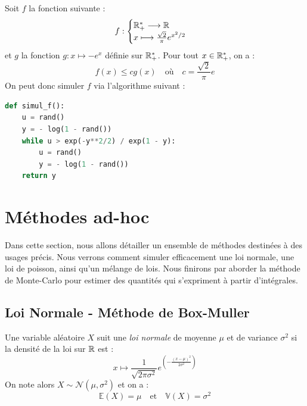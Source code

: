\begin{example}
    Soit $f$ la fonction suivante : 
        $$ 
            f : 
                \begin{cases}
                    \mathbb{R}_+^* \longrightarrow \mathbb{R} \\ 
                    x \longmapsto \frac{\sqrt{2}}{\pi} e^{x^2/2}
                \end{cases}
        $$ 
    et $g$ la fonction $ g : x \longmapsto -e^x$ définie sur $ \mathbb{R}_+^*$. Pour tout $x \in \mathbb{R}_+^*$, on a : 
            $$ f(x) \leqslant cg(x) \quad \text{où} \quad c = \frac{\sqrt{2}}{\pi} e$$
    On peut donc simuler $f$ via l'algorithme suivant : 
    \begin{lstlisting}[language=Python]
def simul_f(): 
    u = rand() 
    y = - log(1 - rand())
    while u > exp(-y**2/2) / exp(1 - y): 
        u = rand() 
        y = - log(1 - rand())
    return y
    \end{lstlisting}
\end{example}



\section{Méthodes ad-hoc}

Dans cette section, nous allons détailler un ensemble de méthodes destinées à des usages précis. 
Nous verrons comment simuler efficacement une loi normale, une loi de poisson, ainsi qu'un mélange de lois. 
Nous finirons par aborder la méthode de Monte-Carlo pour estimer des quantités qui s'expriment à partir d'intégrales. 

\subsection{Loi Normale - Méthode de Box-Muller}

\begin{rappel}
    Une variable aléatoire $X$ suit une \emph{loi normale} de moyenne $ \mu$ et de variance $ \sigma^2$ si 
    la densité de la loi sur $\mathbb{R}$ est : 
        $$ x \longmapsto \frac{1}{\sqrt{2 \pi \sigma^2}} e^{\left( - \frac{(x - \mu)^2}{2 \sigma^2} \right)} $$ 
    On note alors $X \sim \mathcal{N}( \mu, \sigma^2)$ et on a : 
        $$ \mathbb{E}(X) = \mu \quad \text{et} \quad \mathbb{V}(X) = \sigma^2 $$    
\end{rappel}

